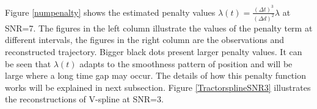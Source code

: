 Figure \ref{numpenalty} shows the estimated penalty values $\lambda(t)=\frac{\left(\Delta t\right)^3}{\left(\Delta d\right)^2}\lambda$ at SNR=7. The figures in the left column illustrate the values of the penalty term at different intervals, the figures in the right column are the observations and reconstructed trajectory. Bigger black dots present larger penalty values. It can be seen that $\lambda(t)$ adapts to the smoothness pattern of position and will be large where a long time gap may occur. The details of how this penalty function works will be explained in next subsection. Figure \ref{TractorsplineSNR3} illustrates the reconstructions of V-spline at SNR=3.



